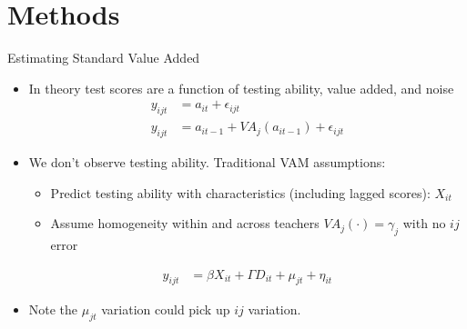 \documentclass[11pt]{beamer}
\begin{document}
\section{Methods}


\begin{frame}{Estimating Standard  Value Added}

\begin{itemize}
    \item In theory test scores are a function of testing ability, value added, and noise
    \begin{align*}
    y_{ijt}  &= a_{it} + \epsilon_{ijt} \\
    y_{ijt}  &= a_{it-1} + VA_j(a_{it-1}) + \epsilon_{ijt}
    \end{align*}
 
    \item We don't observe testing ability. Traditional VAM assumptions:
    \begin{itemize}
        \item Predict testing ability with characteristics (including lagged scores): $X_{it}$
        \item Assume homogeneity within and across teachers $VA_j(\cdot)=\gamma_j$ with no $ij$ error
    \end{itemize}
    \begin{align*}
    y_{ijt}  &= \beta X_{it} +\Gamma D_{it} +\mu_{jt} + \eta_{it}
    \end{align*}
    
    \item Note the $\mu_{jt}$ variation could pick up $ij$ variation.
       
    
\end{itemize}
\end{frame}


\end{document}
